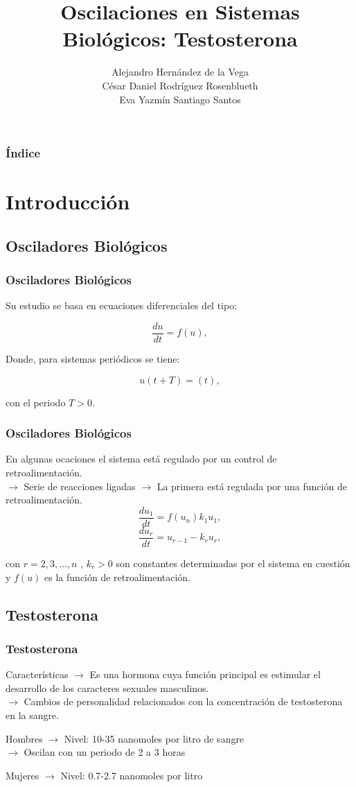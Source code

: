 \documentclass[10pt]{beamer}
\title[Oscilaciones en Sistemas Biológicos: Testosterona]{Oscilaciones en Sistemas Biológicos: Testosterona}
\author{Alejandro Hernández de la Vega\\ César Daniel Rodríguez Rosenblueth \\ Eva Yazmín Santiago Santos}
\institute{Facultad de Ciencias. UNAM}
\date{}
\begin{document}
\begin{frame}
\titlepage
\end{frame}

\begin{frame}
\frametitle{Índice}
\tableofcontents
\end{frame}

\section{Introducción}

\subsection{Osciladores Biológicos}

\begin{frame}
\frametitle{Osciladores Biológicos}
Su estudio se basa en ecuaciones diferenciales del tipo:

$$\dfrac{du}{dt} = f(u) ,$$

Donde, para sistemas periódicos se tiene:

$$u(t+T)= (t) ,$$

con el periodo $T>0$.
\end{frame}

\begin{frame}
\frametitle{Osciladores Biológicos}
En algunas ocaciones el sistema está regulado por un control de retroalimentación. \\
$\rightarrow$  Serie de reacciones ligadas
$\rightarrow$ La primera está regulada por una función de retroalimentación.\\

$$ \dfrac{d u_1}{dt} = f(u_n )k_1 u_1 , $$
$$ \dfrac{d u_r}{dt}= u_{r-1} -k_r u_r , $$

con $r=2,3,...,n$ , $ k_r > 0$ son constantes determinadas por el sistema en cuestión y $ f(u)$ es la función de retroalimentación.
\end{frame}


\subsection{Testosterona}
\begin{frame}
\frametitle{Testosterona}
\begin{block}{Características}
$\rightarrow$ Es una hormona cuya función principal es estimular el desarrollo de los caracteres sexuales masculinos.\\
$\rightarrow$ Cambios de personalidad relacionados con la concentración de testosterona en la sangre.
\end{block}
\begin{block}{Hombres}
$\rightarrow$ Nivel: 10-35 nanomoles por litro de sangre\\
$\rightarrow$ Oscilan con un periodo de 2 a 3 horas
\end{block}
\begin{block}{Mujeres}
$\rightarrow$ Nivel: 0.7-2.7 nanomoles por litro
\end{block}
\end{frame}
\end{document}
